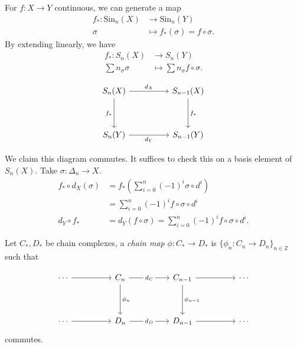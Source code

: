 For $f : X \to  Y$ continuous, we can generate a map
\begin{align*}
	f_*: \text{Sin}_n(X) &\longrightarrow \text{Sin}_n(Y) \\
	\sigma &\longmapsto f_*(\sigma) = f \circ \sigma
.\end{align*}
By extending linearly, we have
\begin{align*}
	f_*: S_n(X) &\longrightarrow S_n(Y) \\
	\sum n_\sigma \sigma &\longmapsto \sum n_\sigma f \circ \sigma
.\end{align*}

\[\begin{tikzcd}
	{S_n(X)} && {S_{n-1}(X)} \\
	\\
	{S_n(Y)} && {S_{n-1}(Y)}
	\arrow["{d_X}", from=1-1, to=1-3]
	\arrow["{f_*}"', from=1-1, to=3-1]
	\arrow["{d_Y}"', from=3-1, to=3-3]
	\arrow["{f_*}", from=1-3, to=3-3]
\end{tikzcd}\]

We claim this diagram commutes. It suffices to check this on a basis element of $S_n(X)$. Take $\sigma: \Delta_n \to  X$. 
\begin{align*}
	f_* \circ d_X(\sigma) 
	&= f_*\left( \sum_{i=0}^{n} (-1)^i \sigma \circ d^i \right) \\
	&=  \sum_{i=0}^{n} (-1)^i f \circ \sigma \circ d^i  \\
	d_Y \circ f_* 
	&= d_Y(f \circ \sigma) = \sum_{i=0}^{n} (-1)^i f\circ \sigma \circ d^i 
.\end{align*}

\begin{definition}
	\label{defn:ChainMap}
	Let $C_*, D_*$ be chain complexes, a \textit{chain map} $\phi: C_* \to D_*$ is $\{\phi_n: C_n \to  D_n\} _{n \in \mathbb{Z}}$ such that

\[\begin{tikzcd}
	\cdots && {C_n} && {C_{n-1}} && \cdots \\
	\\
	\cdots && {D_n} && {D_{n-1}} && \cdots
	\arrow["{\phi_n}", from=1-3, to=3-3]
	\arrow["{\phi_{n-1}}", from=1-5, to=3-5]
	\arrow["{d_C}"{description}, from=1-3, to=1-5]
	\arrow["{d_D}"{description}, from=3-3, to=3-5]
	\arrow[from=3-1, to=3-3]
	\arrow[from=3-5, to=3-7]
	\arrow[from=1-5, to=1-7]
	\arrow[from=1-1, to=1-3]
\end{tikzcd}\]	
commutes.
\end{definition}

